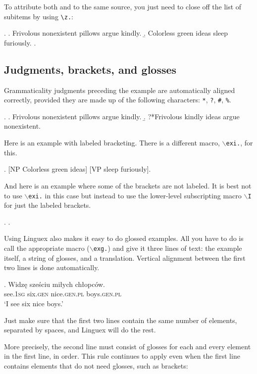 \documentclass[letterpaper,12pt, twoside]{article}
\begin{document}
To attribute both \Last[a] and \Last[b] to the same source, you just need to close off the list of subitems by using \verb|\z.|:

\ex. 
\a. Frivolous nonexistent pillows argue kindly. 
\b. Colorless green ideas sleep furiously.
\z. \citep{journalarticle}



\subsection{Judgments, brackets, and glosses}\label{secjbg}



Grammaticality judgments preceding the example are automatically aligned correctly, provided they are made up of the following characters: \texttt{*}, \texttt{?}, \texttt{\#}, \texttt{\%}.

\ex. 
\a. Frivolous nonexistent pillows argue kindly.
\b. ?*Frivolous  kindly ideas argue nonexistent.


Here is an example with labeled bracketing. There is a different macro, \texttt{$\backslash$exi.}, for this.

\exi. [NP Colorless green ideas] [VP sleep furiously].

And here is an example where some of the brackets are not labeled. It is best not to use \texttt{$\backslash$exi.} in this case but instead to use the lower-level subscripting macro \texttt{$\backslash$I} for just the labeled brackets.

\ex. . 


Using {Linguex} also makes it easy to do glossed examples. All you have to do is call the appropriate macro (\texttt{$\backslash$exg.}) and give it three lines of text: the example itself, a string of glosses, and a translation. Vertical alignment between the first two lines is done automatically. 


\exg. Widz\k{e}  sze\'sciu {mi\l ych} {ch\l opc\'ow}. \\ 
see.\textsc{1sg} six.\textsc{gen} nice.\textsc{gen.pl} boys.\textsc{gen.pl} \\ 
 `I see six nice boys.'

Just make sure that the first two lines contain the same number of elements, separated by spaces, and {Linguex} will do the rest. 

More precisely, the second line must consist of glosses for each and every element in the first line, in order. This rule continues to apply even when the first line contains elements that do not need glosses, such as brackets:
\end{document}
